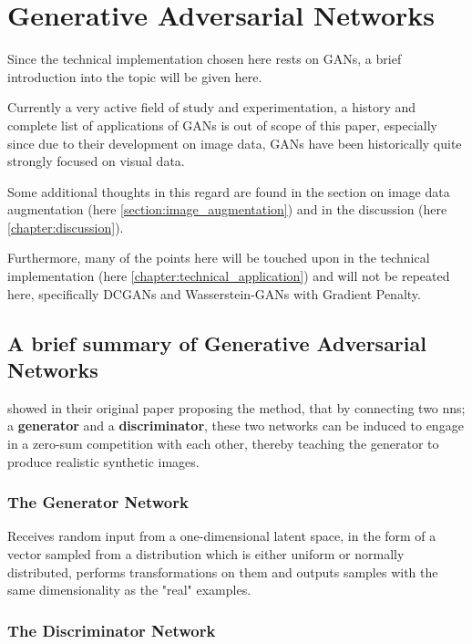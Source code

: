 \chapter{Generative Adversarial Networks}
\label{chapter:gan}

Since the technical implementation chosen here rests on \acp{GAN}, a brief introduction into the topic will be given here. 

Currently a very active field of study and experimentation, a history and complete list of applications of \acp{GAN} is out of scope of this paper, especially since due to their development on image data, \acp{GAN} have been historically quite strongly focused on visual data. 

Some additional thoughts in this regard are found in the section on image data augmentation (here \ref{section:image_augmentation}) and in the discussion (here \ref{chapter:discussion}).

Furthermore, many of the points here will be touched upon in the technical implementation (here \ref{chapter:technical_application}) and will not be repeated here, specifically \acp{DCGAN} and Wasserstein-\acp{GAN} with Gradient Penalty.

\pagebreak

\section{A brief summary of Generative Adversarial Networks}

\cite{goodfellow2014generative} showed in their original paper proposing the method, that by connecting two \acp{nn}; a \textbf{generator} and a \textbf{discriminator}, these two networks can be induced to engage in a zero-sum competition with each other, thereby teaching the generator to produce realistic synthetic images. 

\subsection{The Generator Network}

Receives random input from a one-dimensional latent space, in the form of a vector sampled from a distribution which is either uniform or normally distributed, performs transformations on them and outputs samples with the same dimensionality as the "real" examples.

\subsection{The Discriminator Network}

